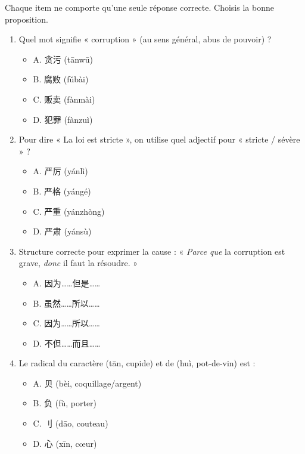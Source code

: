 \documentclass[11pt]{article}
\newcommand{\zh}[1]{\ifmmode\text{#1}\else{#1}\fi}
\begin{document}
\begin{exercice}
Chaque item ne comporte qu'une seule réponse correcte. Choisis la bonne proposition.
\begin{enumerate}
    \item Quel mot signifie « corruption » (au sens général, abus de pouvoir) ?
    \begin{itemize}
        \item A. 贪污 (tānwū)
        \item B. 腐败 (fǔbài)
        \item C. 贩卖 (fànmài)
        \item D. 犯罪 (fànzuì)
    \end{itemize}
    \item Pour dire « La loi est stricte », on utilise quel adjectif pour « stricte / sévère » ?
    \begin{itemize}
        \item A. 严厉 (yánlì)
        \item B. 严格 (yángé)
        \item C. 严重 (yánzhòng)
        \item D. 严肃 (yánsù)
    \end{itemize}
    \item Structure correcte pour exprimer la cause : « \emph{Parce que} la corruption est grave, \emph{donc} il faut la résoudre. »
    \begin{itemize}
        \item A. 因为……但是……
        \item B. 虽然……所以……
        \item C. 因为……所以……
        \item D. 不但……而且……
    \end{itemize}
    \item Le radical du caractère \zh{贪} (tān, cupide) et de \zh{贿} (huì, pot-de-vin) est :
    \begin{itemize}
        \item A. 贝 (bèi, coquillage/argent)
        \item B. 负 (fù, porter)
        \item C. 刂 (dāo, couteau)
        \item D. 心 (xīn, cœur)
    \end{itemize}
\end{enumerate}
\end{exercice}
\end{document}
